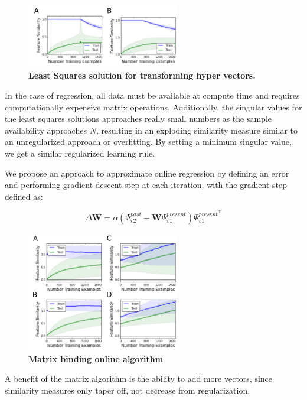 \documentclass{article}
\begin{document}
\begin{figure}
\centering
\includegraphics[width=0.6\textwidth]{regression_issue-170518.png}
\caption{\textbf{Least Squares solution for transforming hyper vectors.}}
\end{figure}

In the case of regression, all data must be available at compute time and requires computationally expensive matrix operations. Additionally, the singular values for the least squares solutions approaches really small numbers as the sample availability approaches $N$, resulting in an exploding similarity measure similar to an unregularized approach or overfitting. By setting a minimum singular value, we get a similar regularized learning rule.

We propose an approach to approximate online regression by defining an error and performing gradient descent step at each iteration, with the gradient step defined as:

\begin{equation}
\Delta \mathbf{W} = \alpha (\Psi^{past}_{v2} - \mathbf{W} \Psi^{present}_{v1}) \Psi^{present^\top}_{v1}
\end{equation}


\begin{figure}[h]
\centering
\includegraphics[width=0.6\textwidth]{outer_product_algorithm-170518.png}
\caption{\textbf{Matrix binding online algorithm}}
\end{figure}

A benefit of the matrix algorithm is the ability to add more vectors, since similarity measures only taper off, not decrease from regularization.
\end{document}
